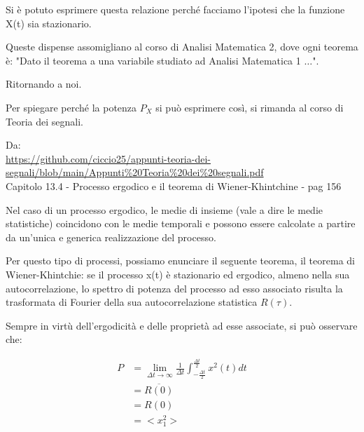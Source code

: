 Si è potuto esprimere questa relazione perché facciamo l'ipotesi che la funzione X(t) sia stazionario. \newline 

\begin{tcolorbox}
    Queste dispense assomigliano al corso di Analisi Matematica 2, dove ogni teorema è: "Dato il teorema a una variabile studiato ad Analisi Matematica 1 $\dots$". \newline 

    Ritornando a noi. \newline 

    Per spiegare perché la potenza $P_X$ si può esprimere così, si rimanda al corso di Teoria dei segnali. \newline 
 
    Da: \\
    \url{https://github.com/ciccio25/appunti-teoria-dei-segnali/blob/main/Appunti%20Teoria%20dei%20segnali.pdf} \\
    Capitolo 13.4 - Processo ergodico e il teorema di Wiener-Khintchine - pag 156 \newline 


Nel caso di un processo ergodico, le medie di insieme (vale a dire le medie statistiche) coincidono con le medie temporali e possono essere 
calcolate a partire da un'unica e generica realizzazione del processo. \newline 

Per questo tipo di processi, possiamo enunciare il seguente teorema, il teorema di Wiener-Khintchie: 
se il processo x(t) è stazionario ed ergodico, almeno nella sua autocorrelazione, lo spettro di potenza del processo ad esso associato risulta 
la trasformata di Fourier della sua autocorrelazione statistica $R(\tau)$. \newline 


Sempre in virtù dell'ergodicità e delle proprietà ad esse associate, si può osservare che:

{
    \Large 
    \begin{equation}
        \begin{split}
            P 
            &= 
            \lim_{\Delta t \to \infty}
            \frac{1}{\Delta t}
            \int_{-\frac{\Delta t}{2}}^{\frac{\Delta t}{2}}
            x^{2} (t) dt 
            \\ 
            &= 
            \overline{R (0)}
            \\ 
            &= 
            R(0)
            \\ 
            &= 
            <x_1 ^{2}>
        \end{split}
    \end{equation}
}

\end{tcolorbox}

